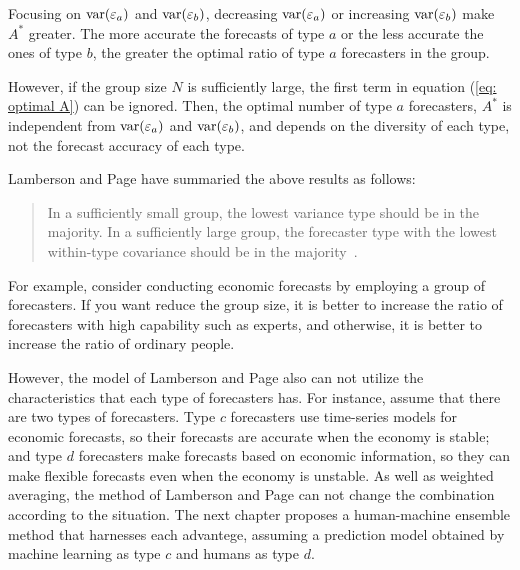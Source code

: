 \documentclass[../main.tex]{subfiles}
\begin{document}
Focusing on $\operatorname{var}(\varepsilon_a)$ and $\operatorname{var}(\varepsilon_b)$, decreasing $\operatorname{var}(\varepsilon_a)$ or increasing $\operatorname{var}(\varepsilon_b)$ make $A^\ast$ greater.
The more accurate the forecasts of type $a$ or the less accurate the ones of type $b$, the greater the optimal ratio of type $a$ forecasters in the group.

However, if the group size $N$ is sufficiently large, the first term in equation (\ref{eq: optimal A}) can be ignored.
Then, the optimal number of type $a$ forecasters, $A^\ast$ is independent from $\operatorname{var}(\varepsilon_a)$ and $\operatorname{var}(\varepsilon_b)$, and depends on the diversity of each type, not the forecast accuracy of each type.

Lamberson and Page have summaried the above results as follows:
\begin{quote}
  In a sufficiently small group, the lowest variance type should be in the majority.
  In a sufficiently large group, the forecaster type with the lowest within-type covariance should be in the majority~\cite{Lamberson2012}.
\end{quote}
For example, consider conducting economic forecasts by employing a group of forecasters.
If you want reduce the group size, it is better to increase the ratio of forecasters with high capability such as experts, and otherwise, it is better to increase the ratio of ordinary people.

However, the model of Lamberson and Page also can not utilize the characteristics that each type of forecasters has.
For instance, assume that there are two types of forecasters. Type $c$ forecasters use time-series models for economic forecasts, so their forecasts are accurate when the economy is stable; and type $d$ forecasters make forecasts based on economic information, so they can make flexible forecasts even when the economy is unstable.
As well as weighted averaging, the method of Lamberson and Page can not change the combination according to the situation.
The next chapter proposes a human-machine ensemble method that harnesses each advantege, assuming a prediction model obtained by machine learning as type $c$ and humans as type $d$.
\end{document}
